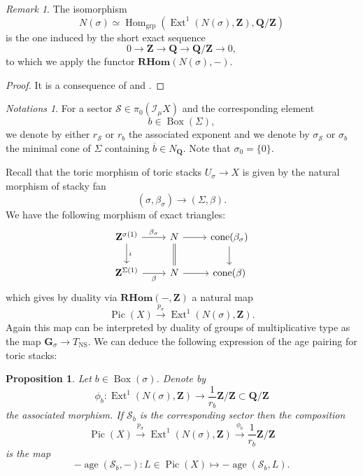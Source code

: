 \documentclass{proc-l}
\newcommand{\Z}{\mathbf{Z}}
\newcommand{\Q}{\mathbf{Q}}
\newcommand{\G}{\mathbf{G}}
\DeclareMathOperator{\Pic}{Pic}
\DeclareMathOperator{\grp}{grp}
\DeclareMathOperator{\Hom}{Hom}
\DeclareMathOperator{\Ext}{Ext}
\DeclareMathOperator{\coneform}{cone}
\DeclareMathOperator{\age}{age}
\DeclareMathOperator{\NS}{NS}
\DeclareMathOperator{\Boxe}{Box}
\newcommand{\stackS}{\mathcal{S}}
\newcommand{\sheafI}{\mathcal{I}}
\newcommand{\RHom}{\mathbf{R Hom}}
\newcommand{\sector}{\pi_0(\sheafI_{\mu} X)}
\newtheorem{prop}[theorem]{Proposition}
\theoremstyle{definition}
\theoremstyle{remark}
\newtheorem{remark}[theorem]{Remark}
\newtheorem{Notations}[theorem]{Notations}
\numberwithin{equation}{section}
\begin{document}
\begin{remark}
The isomorphism
\[
N(\sigma) \simeq \Hom_{\grp}\!\left(\Ext^1(N(\sigma),\Z),\Q/\Z\right)
\]
is the one induced by the short exact sequence
\[
0 \longrightarrow \Z \longrightarrow \Q \longrightarrow \Q/\Z \longrightarrow 0,
\]
to which we apply the functor $\mathbf{RHom}(N(\sigma),-)$.
\end{remark}

\begin{proof}
    It is a consequence of \cite[lemma 4.6]{borisov_toric_stack} and \cite[lemma 3.1.4]{darda_yasuda_toric_stacks_batyrev}.
\end{proof}

\begin{Notations}\label{notation_cone_minimal_sector}
For a sector $\stackS \in \sector$ and the corresponding element
$$b \in \Boxe(\Sigma),$$we denote by either $r_{\stackS}$ or $r_b$ the associated exponent and  we denote by $\sigma_{\stackS}$ or $\sigma_b$ the minimal
cone of $\Sigma$ containing $\overline{b} \in N_{\Q}$.  Note that $\sigma_0 = \{0\}$.
\end{Notations}



Recall that the toric morphism of toric stacks $U_{\sigma} \rightarrow X$ is given by the natural morphism of stacky fan $$(\sigma, \beta_{\sigma}) \rightarrow (\Sigma,\beta) .$$We have the following morphism of exact triangles:
\begin{equation}\label{equation_morphism_triangle_distingue_associe_open_immersion}
\begin{tikzcd}
\Z^{\sigma(1)} \arrow[r, "\beta_{\sigma}"] \arrow[d, "i"] & N \arrow[r] \arrow[d, equal] & \coneform(\beta_{\sigma}) \arrow[d] \\
\Z^{\Sigma(1)} \arrow[r, "\beta"']                        & N \arrow[r]                       & \coneform(\beta)                   
\end{tikzcd}
\end{equation}which gives by duality via $\RHom(-,\Z)$ a natural map $$ \Pic(X) \xrightarrow{p_{\sigma}} \Ext^1(N(\sigma),\Z) .$$Again this map can be interpreted by duality of groups of multiplicative type as the map $\G_{\sigma} \rightarrow T_{\NS}$. We can deduce the following expression of the age pairing for toric stacks:

\begin{prop}\label{prop_expression_age_sector_toric_stack}
    Let $b \in \Boxe(\sigma)$. Denote by $$\phi_b : \Ext^1(N(\sigma),\Z) \rightarrow \frac{1}{r_b} \Z / \Z \subset \Q / \Z $$ the associated morphism. If $\stackS_b$ is the corresponding sector then the composition $$ \Pic(X) \xrightarrow{p_{\sigma}} \Ext^1(N(\sigma),\Z) \xrightarrow{\phi_b}  \frac{1}{r_b} \Z / \Z$$ is the map $$- \age(\stackS_b,-) : L \in \Pic(X) \longmapsto -\age(\stackS_b,L) .$$
\end{prop}
\end{document}
